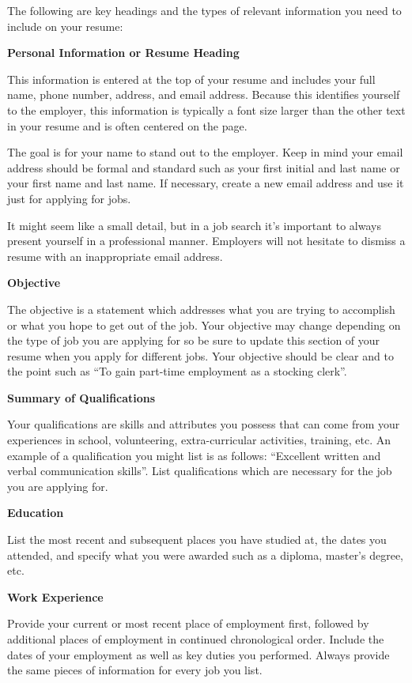 The following are key headings and the types of relevant information you need to include on your resume:

\textbf{Personal Information or Resume Heading}

This information is entered at the top of your resume and includes your full name, phone number, address, and email address. Because this identifies yourself to the employer, this information is typically a font size larger than the other text in your resume and is often centered on the page.

The goal is for your name to stand out to the employer. Keep in mind your email address should be formal and standard such as your first initial and last name or your first name and last name. If necessary, create a new email address and use it just for applying for jobs.

It might seem like a small detail, but in a job search it's important to always present yourself in a professional manner. Employers will not hesitate to dismiss a resume with an inappropriate email address.

\textbf{Objective}

The objective is a statement which addresses what you are trying to accomplish or what you hope to get out of the job. Your objective may change depending on the type of job you are applying for so be sure to update this section of your resume when you apply for different jobs. Your objective should be clear and to the point such as ``To gain part-time employment as a stocking clerk''.

\textbf{Summary of Qualifications}

Your qualifications are skills and attributes you possess that can come from your experiences in school, volunteering, extra-curricular activities, training, etc. An example of a qualification you might list is as follows: ``Excellent written and verbal communication skills''. List qualifications which are necessary for the job you are applying for.

\textbf{Education}

List the most recent and subsequent places you have studied at, the dates you attended, and specify what you were awarded such as a diploma, master's degree, etc.

\textbf{Work Experience}

Provide your current or most recent place of employment first, followed by additional places of employment in continued chronological order. Include the dates of your employment as well as key duties you performed.
Always provide the same pieces of information for every job you list.

